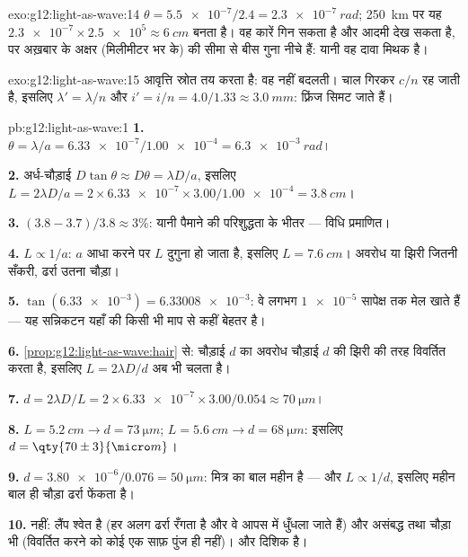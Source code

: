 \begin{solution}{exo:g12:light-as-wave:14}
$\theta = \num{5.5e-7}/2.4 = \qty{2.3e-7}{rad}$; \qty{250}{km} पर यह $\num{2.3e-7} \times \num{2.5e5} \approx \qty{6}{cm}$ बनता है। वह कारें गिन सकता है और आदमी देख सकता
है, पर अख़बार के अक्षर (मिलीमीटर भर के)  की सीमा से बीस गुना
नीचे हैं: यानी वह दावा मिथक है।
\end{solution}

\begin{solution}{exo:g12:light-as-wave:15}
आवृत्ति स्रोत तय करता है: वह नहीं बदलती। चाल गिरकर $c/n$ रह जाती है,
इसलिए $\lambda' = \lambda/n$ और $i' = i/n = 4.0/1.33 \approx \qty{3.0}{mm}$: फ़्रिंज सिमट जाते हैं।
\end{solution}

\begin{solution}{pb:g12:light-as-wave:1}
\textbf{1.} $\theta = \lambda/a = \num{6.33e-7}/\num{1.00e-4} =
\qty{6.3e-3}{rad}$।

\textbf{2.} अर्ध-चौड़ाई $D\tan\theta \approx D\theta = \lambda D/a$, इसलिए $L = 2\lambda D/a = 2 \times \num{6.33e-7} \times
3.00/\num{1.00e-4} = \qty{3.8}{cm}$।

\textbf{3.} $(3.8 - 3.7)/3.8 \approx 3\%$: यानी पैमाने की परिशुद्धता के भीतर --- विधि प्रमाणित।

\textbf{4.} $L \propto 1/a$: $a$ आधा करने पर $L$ दुगुना हो जाता है, इसलिए
$L = \qty{7.6}{cm}$। अवरोध या झिरी जितनी सँकरी, ढर्रा उतना चौड़ा।

\textbf{5.} $\tan(\num{6.33e-3}) = \num{6.33008e-3}$: वे लगभग $\num{1e-5}$ सापेक्ष तक मेल खाते हैं --- यह सन्निकटन
यहाँ की किसी भी माप से कहीं बेहतर है।

\textbf{6.} \cref{prop:g12:light-as-wave:hair} से: चौड़ाई $d$ का अवरोध चौड़ाई $d$ की झिरी की तरह
विवर्तित करता है, इसलिए $L = 2\lambda D/d$ अब भी चलता है।

\textbf{7.} $d = 2\lambda D/L = 2 \times \num{6.33e-7} \times
3.00/0.054 \approx \qty{70}{\micro m}$।

\textbf{8.} $L = \qty{5.2}{cm} \to d = \qty{73}{\micro m}$; $L = \qty{5.6}{cm} \to d = \qty{68}{\micro m}$: इसलिए $d = \qty{70 \pm 3}{\micro m}$।

\textbf{9.} $d = \num{3.80e-6}/0.076 = \qty{50}{\micro m}$: मित्र का बाल महीन है --- और $L \propto 1/d$, इसलिए महीन बाल ही
चौड़ा ढर्रा फेंकता है।

\textbf{10.} नहीं: लैंप श्वेत है (हर  अलग ढर्रा रँगता है
और वे आपस में धुँधला जाते हैं) और असंबद्ध तथा चौड़ा भी (विवर्तित करने को कोई
एक साफ़ पुंज ही नहीं)।   और दिशिक है।


\end{solution}
